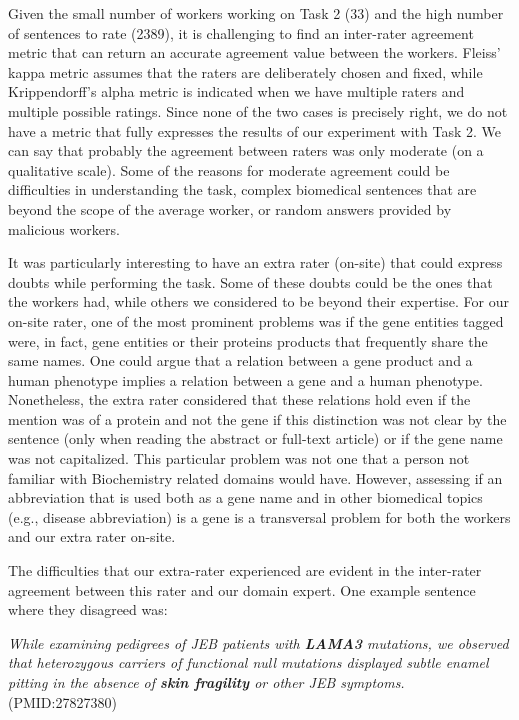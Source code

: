 Given the small number of workers working on Task 2 (33) and the high number of sentences to rate (2389), it is challenging to find an inter-rater agreement metric that can return an accurate agreement value between the workers. Fleiss’ kappa metric assumes that the raters are deliberately chosen and fixed, while Krippendorff’s alpha metric is indicated when we have multiple raters and multiple possible ratings. Since none of the two cases is precisely right, we do not have a metric that fully expresses the results of our experiment with Task 2. We can say that probably the agreement between raters was only moderate (on a qualitative scale). Some of the reasons for moderate agreement could be difficulties in understanding the task, complex biomedical sentences that are beyond the scope of the average worker, or random answers provided by malicious workers. 

It was particularly interesting to have an extra rater (on-site) that could express doubts while performing the task. Some of these doubts could be the ones that the workers had, while others we considered to be beyond their expertise. For our on-site rater, one of the most prominent problems was if the gene entities tagged were, in fact, gene entities or their proteins products that frequently share the same names. One could argue that a relation between a gene product and a human phenotype implies a relation between a gene and a human phenotype. Nonetheless, the extra rater considered that these relations hold even if the mention was of a protein and not the gene if this distinction was not clear by the sentence (only when reading the abstract or full-text article) or if the gene name was not capitalized. This particular problem was not one that a person not familiar with Biochemistry related domains would have. However, assessing if an abbreviation that is used both as a gene name and in other biomedical topics (e.g., disease abbreviation) is a gene is a transversal problem for both the workers and our extra rater on-site. 

The difficulties that our extra-rater experienced are evident in the inter-rater agreement between this rater and our domain expert. One example sentence where they disagreed was:

\textit{While examining pedigrees of JEB patients with \textbf{LAMA3} mutations, we observed that heterozygous carriers of functional null mutations displayed subtle enamel pitting in the absence of \textbf{skin fragility} or other JEB symptoms.} (PMID:27827380)


